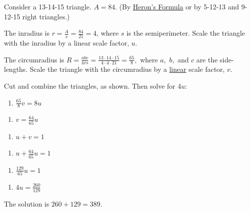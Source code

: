 \begin{enumerate}
 Consider a 13-14-15 triangle.  $A=84.$  (By \href{https://artofproblemsolving.com/wiki/index.php?title=Heron\%27s\_Formula}{Heron's Formula} or by 5-12-13 and 9-12-15 right triangles.)

 The inradius is $r=\frac{A}{s}=\frac{84}{21}=4$, where $s$ is the semiperimeter.  Scale the triangle with the inradius by a linear scale factor, $u.$

 The circumradius is $R=\frac{abc}{4rs}=\frac{13\cdot 14\cdot 15}{4\cdot 4\cdot 21}=\frac{65}{8},$ where $a,$ $b,$ and $c$ are the side-lengths.  Scale the triangle with the circumradius by a \href{https://artofproblemsolving.com/wiki/index.php?title=Line}{linear} scale factor, $v$.

 Cut and combine the triangles, as shown.  Then solve for $4u$:

 
            \begin{enumerate}[label=(\roman*)]
                \item $\frac{65}{8}v=8u$
            \end{enumerate}
            
            \begin{enumerate}[label=(\roman*)]
                \item $v=\frac{64}{65}u$
            \end{enumerate}
            
            \begin{enumerate}[label=(\roman*)]
                \item $u+v=1$
            \end{enumerate}
            
            \begin{enumerate}[label=(\roman*)]
                \item $u+\frac{64}{65}u=1$
            \end{enumerate}
            
            \begin{enumerate}[label=(\roman*)]
                \item $\frac{129}{65}u=1$
            \end{enumerate}
            
            \begin{enumerate}[label=(\roman*)]
                \item $4u=\frac{260}{129}$
            \end{enumerate}
            The solution is $260+129=\boxed{389}$.


\end{enumerate}
